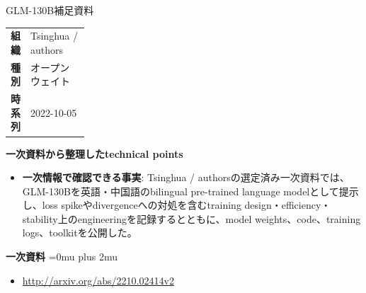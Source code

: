 \begin{technicalnote}{GLM-130B}{補足資料}
\begingroup
\begin{tabularx}{\linewidth}{@{}>{\bfseries}p{0.22\linewidth}X@{}}
組織 & Tsinghua / authors \\
種別 & オープンウェイト \\
時系列 & 2022-10-05 \\
\end{tabularx}
\smallskip
{\bfseries 一次資料から整理したtechnical points}
\begin{itemize}[leftmargin=1.5em,itemsep=0.35em]
\item \textbf{一次情報で確認できる事実}: Tsinghua / authorsの選定済み一次資料では、GLM-130Bを英語・中国語のbilingual pre-trained language modelとして提示し、loss spikeやdivergenceへの対処を含むtraining design・efficiency・stability上のengineeringを記録するとともに、model weights、code、training logs、toolkitを公開した。
\end{itemize}
\begin{minipage}{\linewidth}
\begin{samepage}
{\bfseries 一次資料}
\begingroup\sloppy
\Urlmuskip=0mu plus 2mu\relax
\begin{itemize}[leftmargin=1.5em,itemsep=0.25em]
\item {\scriptsize\url{http://arxiv.org/abs/2210.02414v2}}
\end{itemize}
\endgroup
\end{samepage}
\end{minipage}
\endgroup
\end{technicalnote}
\medskip
